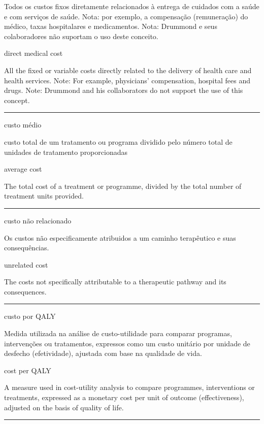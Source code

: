 \documentclass[
  openany]{book}
\begin{document}
Todos os custos fixos diretamente relacionados à entrega de cuidados com a saúde e com serviços de saúde. Nota: por exemplo, a compensação (remuneração) do médico, taxas hospitalares e medicamentos. Nota: Drummond e seus colaboradores não suportam o uso deste conceito.

direct medical cost

All the fixed or variable costs directly related to the delivery of health care and health services. Note: For example, physicians' compensation, hospital fees and drugs. Note: Drummond and his collaborators do not support the use of this concept.

\begin{center}\rule{0.5\linewidth}{0.5pt}\end{center}

custo médio

custo total de um tratamento ou programa dividido pelo número total de unidades de tratamento proporcionadas

average cost

The total cost of a treatment or programme, divided by the total number of treatment units provided.

\begin{center}\rule{0.5\linewidth}{0.5pt}\end{center}

custo não relacionado

Os custos não especificamente atribuidos a um caminho terapêutico e suas consequências.

unrelated cost

The costs not specifically attributable to a therapeutic pathway and its consequences.

\begin{center}\rule{0.5\linewidth}{0.5pt}\end{center}

custo por QALY

Medida utilizada na análise de custo-utilidade para comparar programas, intervenções ou tratamentos, expressos como um custo unitário por unidade de desfecho (efetividade), ajustada com base na qualidade de vida.

cost per QALY

A measure used in cost-utility analysis to compare programmes, interventions or treatments, expressed as a monetary cost per unit of outcome (effectiveness), adjusted on the basis of quality of life.

\begin{center}\rule{0.5\linewidth}{0.5pt}\end{center}
\end{document}
